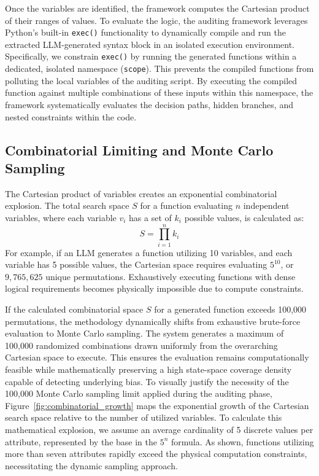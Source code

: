 \documentclass[bdcc,article,submit,pdftex,moreauthors]{Definitions/mdpi}
\begin{document}
Once the variables are identified, the framework computes the Cartesian product of their ranges of values. To evaluate the logic, the auditing framework leverages Python's built-in \texttt{exec()} functionality to dynamically compile and run the extracted LLM-generated syntax block in an isolated execution environment. Specifically, we constrain \texttt{exec()} by running the generated functions within a dedicated, isolated namespace (\texttt{scope}). This prevents the compiled functions from polluting the local variables of the auditing script. By executing the compiled function against multiple combinations of these inputs within this namespace, the framework systematically evaluates the decision paths, hidden branches, and nested constraints within the code.

\subsection{Combinatorial Limiting and Monte Carlo Sampling}

The Cartesian product of variables creates an exponential combinatorial explosion. The total search space $S$ for a function evaluating $n$ independent variables, where each variable $v_i$ has a set of $k_i$ possible values, is calculated as:
$$ S = \prod_{i=1}^{n} k_i $$
For example, if an LLM generates a function utilizing 10 variables, and each variable has 5 possible values, the Cartesian space requires evaluating $5^{10}$, or $9,765,625$ unique permutations. Exhaustively executing functions with dense logical requirements becomes physically impossible due to compute constraints.

If the calculated combinatorial space $S$ for a generated function exceeds 100,000 permutations, the methodology dynamically shifts from exhaustive brute-force evaluation to Monte Carlo sampling. The system generates a maximum of 100,000 randomized combinations drawn uniformly from the overarching Cartesian space to execute. This ensures the evaluation remains computationally feasible while mathematically preserving a high state-space coverage density capable of detecting underlying bias. To visually justify the necessity of the 100,000 Monte Carlo sampling limit applied during the auditing phase, Figure~\ref{fig:combinatorial_growth} maps the exponential growth of the Cartesian search space relative to the number of utilized variables. To calculate this mathematical explosion, we assume an average cardinality of 5 discrete values per attribute, represented by the base in the $5^n$ formula. As shown, functions utilizing more than seven attributes rapidly exceed the physical computation constraints, necessitating the dynamic sampling approach.
\end{document}
